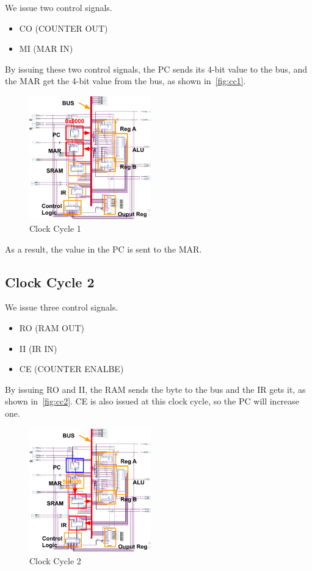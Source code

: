 We issue two control signals.

\begin{itemize}
	\item CO (COUNTER OUT)
	\item MI (MAR IN)
\end{itemize}


By issuing these two control signals, the PC sends its 4-bit value to the bus, and the MAR get the 4-bit value from the bus, as shown in~\autoref{fig:cc1}.

\begin{figure}[th]
	\includegraphics[width=0.47\textwidth]{figures/cc1}
	\centering
	\caption{Clock Cycle 1}
	\label{fig:cc1}
\end{figure}

As a result, the value in the PC is sent to the MAR.


\subsection{Clock Cycle 2}

We issue three control signals.

\begin{itemize}
	\item RO (RAM OUT)
	\item II (IR IN)
	\item CE (COUNTER ENALBE)
\end{itemize}

By issuing RO and II, the RAM sends the byte to the bus and the IR gets it, as shown in~\autoref{fig:cc2}. CE is also issued at this clock cycle, so the PC will increase one.

\begin{figure}[th]
	\includegraphics[width=0.47\textwidth]{figures/cc2}
	\centering
	\caption{Clock Cycle 2}
	\label{fig:cc2}
\end{figure}

